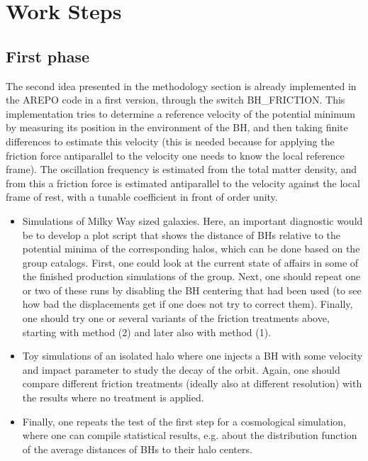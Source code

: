 \documentclass[a4,useAMS,usenatbib,usegraphicx,12pt]{article}
\begin{document}
\section{Work Steps}

\subsection*{First phase}

The second idea presented in the methodology section is already implemented in 
the AREPO \citep{Springel2010} code in a first version, through the switch 
BH\_FRICTION. This implementation tries to determine a reference velocity of 
the potential minimum by measuring its position in the environment of the BH, 
and then taking finite differences to estimate this velocity (this is needed 
because for applying the friction force antiparallel to the velocity one needs 
to know the local reference frame). The oscillation frequency is estimated from 
the total matter density, and from this a friction force is estimated 
antiparallel to the velocity against the local frame of rest, with a tunable 
coefficient in front of order unity.

\begin{itemize}

\item Simulations of Milky Way sized galaxies. Here, an important diagnostic 
would be to develop a plot script that shows the distance of BHs relative to 
the potential minima of the corresponding halos, which can be done based on the 
group catalogs. First, one could look at the current state of affairs in some of 
the finished production simulations of the group. Next, one should repeat one 
or two of these runs by disabling the BH centering that had been used (to see 
how bad the displacements get if one does not try to correct them). Finally, 
one should try one or several variants of the friction treatments above,
starting with method (2) and later also with method (1).

\item Toy simulations of an isolated halo where one injects a BH with some 
velocity and impact parameter to study the decay of the orbit. Again, one should
compare different friction treatments (ideally also at different resolution) 
with the results where no treatment is applied.

\item Finally, one repeats the test of the first step for a cosmological 
simulation, where one can compile statistical results, e.g. about the 
distribution function of the average distances of BHs to their halo centers.

\end{itemize}
\end{document}
